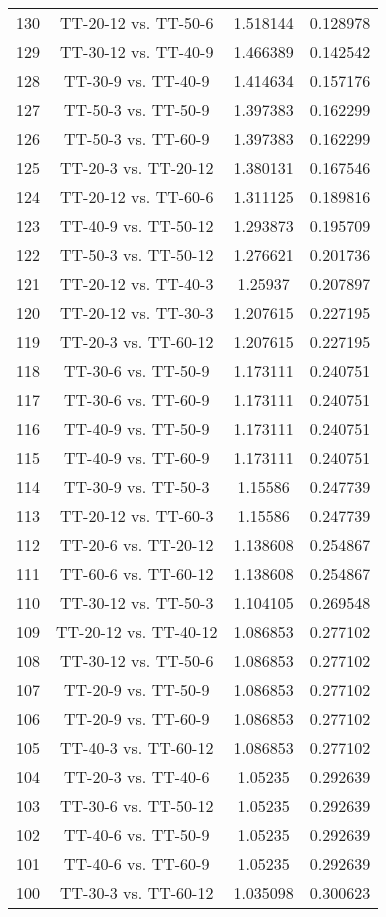 \documentclass[a4paper,10pt]{article}
\begin{document}
\begin{landscape}
\begin{table}[!htp]
\begin{tabular}{cccc}
130&TT-20-12 vs. TT-50-6&1.518144&0.128978\\
129&TT-30-12 vs. TT-40-9&1.466389&0.142542\\
128&TT-30-9 vs. TT-40-9&1.414634&0.157176\\
127&TT-50-3 vs. TT-50-9&1.397383&0.162299\\
126&TT-50-3 vs. TT-60-9&1.397383&0.162299\\
125&TT-20-3 vs. TT-20-12&1.380131&0.167546\\
124&TT-20-12 vs. TT-60-6&1.311125&0.189816\\
123&TT-40-9 vs. TT-50-12&1.293873&0.195709\\
122&TT-50-3 vs. TT-50-12&1.276621&0.201736\\
121&TT-20-12 vs. TT-40-3&1.25937&0.207897\\
120&TT-20-12 vs. TT-30-3&1.207615&0.227195\\
119&TT-20-3 vs. TT-60-12&1.207615&0.227195\\
118&TT-30-6 vs. TT-50-9&1.173111&0.240751\\
117&TT-30-6 vs. TT-60-9&1.173111&0.240751\\
116&TT-40-9 vs. TT-50-9&1.173111&0.240751\\
115&TT-40-9 vs. TT-60-9&1.173111&0.240751\\
114&TT-30-9 vs. TT-50-3&1.15586&0.247739\\
113&TT-20-12 vs. TT-60-3&1.15586&0.247739\\
112&TT-20-6 vs. TT-20-12&1.138608&0.254867\\
111&TT-60-6 vs. TT-60-12&1.138608&0.254867\\
110&TT-30-12 vs. TT-50-3&1.104105&0.269548\\
109&TT-20-12 vs. TT-40-12&1.086853&0.277102\\
108&TT-30-12 vs. TT-50-6&1.086853&0.277102\\
107&TT-20-9 vs. TT-50-9&1.086853&0.277102\\
106&TT-20-9 vs. TT-60-9&1.086853&0.277102\\
105&TT-40-3 vs. TT-60-12&1.086853&0.277102\\
104&TT-20-3 vs. TT-40-6&1.05235&0.292639\\
103&TT-30-6 vs. TT-50-12&1.05235&0.292639\\
102&TT-40-6 vs. TT-50-9&1.05235&0.292639\\
101&TT-40-6 vs. TT-60-9&1.05235&0.292639\\
100&TT-30-3 vs. TT-60-12&1.035098&0.300623\\

\end{tabular}
\end{table}
\end{landscape}
\end{document}

